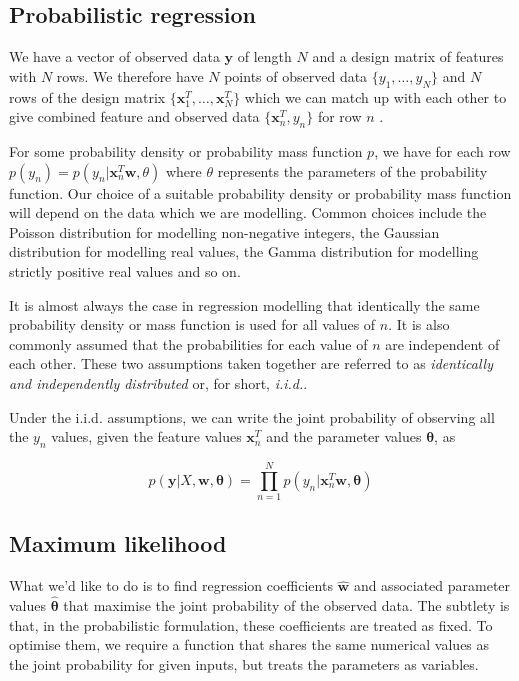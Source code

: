 \documentclass[11pt]{article}
\begin{document}
	\subsection{Probabilistic regression}
	
	We have a vector of observed data $\boldsymbol{y}$ of length $N$ and a design matrix of features with $N$ rows. We therefore have $N$ points of observed data $\{y_{1}, \dots, y_{N}\}$ and $N$ rows of the design matrix $\{\boldsymbol{x}^{T}_{1}, \dots, \boldsymbol{x}^{T}_{N}\}$ which we can match up with each other to give combined feature and observed data $\{\boldsymbol{x}^{T}_{n}, y_{n}\}$ for row $n$ .
	
	For some probability density or probability mass function $p$, we have for each row $p(y_{n}) = p(y_{n}|\boldsymbol{x}^{T}_{n}\boldsymbol{w}, \theta)$ where $\theta$ represents the parameters of the probability function. Our choice of a suitable probability density or probability mass function will depend on the data which we are modelling. Common choices include the Poisson distribution for modelling non-negative integers, the Gaussian distribution for modelling real values, the Gamma distribution for modelling strictly positive real values and so on.
	
	It is almost always the case in regression modelling that identically the same probability density or mass function is used for all values of $n$. It is also commonly assumed that the probabilities for each value of $n$ are independent of each other. These two assumptions taken together are referred to as \emph{identically and independently distributed} or, for short, \emph{i.i.d.}.
	
	Under the i.i.d. assumptions, we can write the joint probability of observing all the $y_n$ values, given the feature values $\boldsymbol{x}^{T}_{n}$ and the parameter values $\boldsymbol{\theta}$, as
	
	\begin{equation}
		p(\boldsymbol{y} | X, \boldsymbol{w}, \boldsymbol{\theta}) = \prod_{n=1}^{N} p(y_n|\boldsymbol{x}^{T}_{n} \boldsymbol{w}, \boldsymbol{\theta})	
	\end{equation}
	
	\subsection{Maximum likelihood}
	
	What we'd like to do is to find regression coefficients \(\boldsymbol{\hat{w}} \) and associated parameter values \( \boldsymbol{\hat{\theta}} \) that maximise the joint probability of the observed data. The subtlety is that, in the probabilistic formulation, these coefficients are treated as fixed. To optimise them, we require a function that shares the same numerical values as the joint probability for given inputs, but treats the parameters as variables.
	
\end{document}
